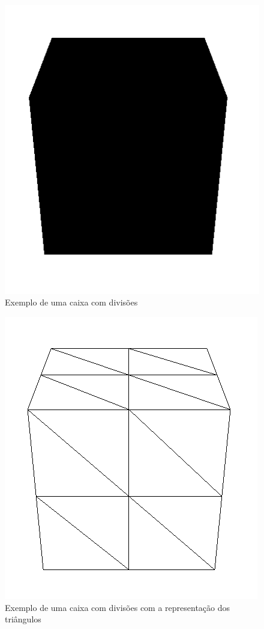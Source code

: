\documentclass{article}
\begin{document}
\begin{figure}[H]
\centering\includegraphics[scale=0.45]{caixaP} 
\caption{\label{fig:controller}Exemplo de uma caixa com divisões}
\end{figure} \begin{figure}[H]
\centering\includegraphics[scale=0.45]{caixaT} 
\caption{\label{fig:controller}Exemplo de uma caixa com divisões com a representação dos triângulos}
\end{figure}
\newpage
\end{document}

